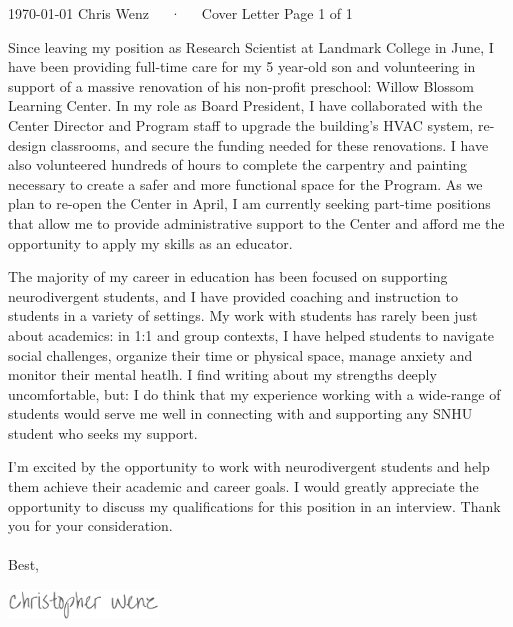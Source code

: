 \documentclass[11pt, a4paper]{awesome-cv}
\begin{document}
\makecvheader[C]

\makecvfooter
  {\today}
  {Chris Wenz~~~·~~~Cover Letter}
  {Page 1 of 1}

\makelettertitle

\begin{cvletter}

Since leaving my position as Research Scientist at Landmark College in June, I have been providing full-time care for my 5 year-old son and volunteering in support of a massive renovation of his non-profit preschool: Willow Blossom Learning Center. In my role as Board President, I have collaborated with the Center Director and Program staff to upgrade the building's HVAC system, re-design classrooms, and secure the funding needed for these renovations. I have also volunteered hundreds of hours to complete the carpentry and painting necessary to create a safer and more functional space for the Program. As we plan to re-open the Center in April, I am currently seeking part-time positions that allow me to provide administrative support to the Center and  afford me the opportunity to apply my skills as an educator. 

The majority of my career in education has been focused on supporting neurodivergent students, and I have provided coaching and instruction to students in a variety of settings. My work with students has rarely been just about academics: in 1:1 and group contexts, I have helped students to navigate social challenges, organize their time or physical space, manage anxiety and monitor their mental heatlh. I find writing about my strengths deeply uncomfortable, but: I do think that my experience working with a wide-range of students would serve me well in connecting with and supporting any SNHU student who seeks my support. 

I'm excited by the opportunity to work with neurodivergent students and help them achieve their academic and career goals. I would greatly appreciate the opportunity to discuss my qualifications for this position in an interview.  Thank you for your consideration. 
\\\\
Best,
\end{cvletter}



\includegraphics[width=4cm, height=0.8cm]{./img/sig.png}
\end{document}

